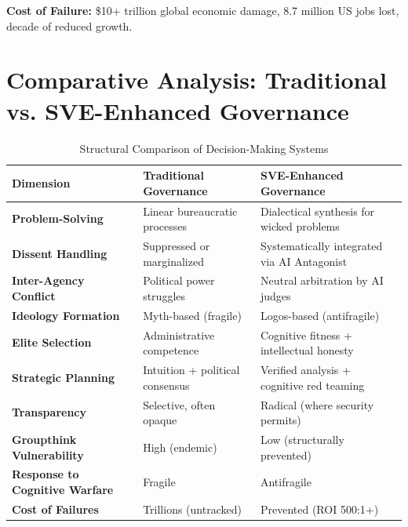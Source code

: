 \documentclass[11pt,a4paper]{article}
\begin{document}
\textbf{Cost of Failure:} \$10+ trillion global economic damage, 8.7 million US jobs lost, decade of reduced growth.

\section{Comparative Analysis: Traditional vs. SVE-Enhanced Governance}
\label{app:comparison}

\begin{table}[h!]
\centering
\caption{Structural Comparison of Decision-Making Systems}
\label{tab:governance_comparison}
\begin{tabular}{@{}p{4cm}p{5cm}p{5cm}@{}}
\toprule
\textbf{Dimension} & \textbf{Traditional Governance} & \textbf{SVE-Enhanced Governance} \\
\midrule
\textbf{Problem-Solving} & Linear bureaucratic processes & Dialectical synthesis for wicked problems \\
\addlinespace
\textbf{Dissent Handling} & Suppressed or marginalized & Systematically integrated via AI Antagonist \\
\addlinespace
\textbf{Inter-Agency Conflict} & Political power struggles & Neutral arbitration by AI judges \\
\addlinespace
\textbf{Ideology Formation} & Myth-based (fragile) & Logos-based (antifragile) \\
\addlinespace
\textbf{Elite Selection} & Administrative competence & Cognitive fitness + intellectual honesty \\
\addlinespace
\textbf{Strategic Planning} & Intuition + political consensus & Verified analysis + cognitive red teaming \\
\addlinespace
\textbf{Transparency} & Selective, often opaque & Radical (where security permits) \\
\addlinespace
\textbf{Groupthink Vulnerability} & High (endemic) & Low (structurally prevented) \\
\addlinespace
\textbf{Response to Cognitive Warfare} & Fragile & Antifragile \\
\addlinespace
\textbf{Cost of Failures} & Trillions (untracked) & Prevented (ROI 500:1+) \\
\bottomrule
\end{tabular}
\end{table}


\clearpage %

\end{document}

